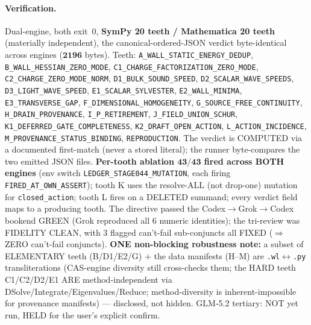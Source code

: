 \paragraph{Verification.}
Dual-engine, both exit~0, \textbf{SymPy 20 teeth / Mathematica 20 teeth} (materially
independent), the canonical-ordered-JSON verdict byte-identical across engines
(\(\mathbf{2196}\) bytes). Teeth: \texttt{A\_WALL\_STATIC\_ENERGY\_DEDUP},
\texttt{B\_WALL\_HESSIAN\_ZERO\_MODE}, \texttt{C1\_CHARGE\_FACTORIZATION\_ZERO\_MODE},
\texttt{C2\_CHARGE\_ZERO\_MODE\_NORM}, \texttt{D1\_BULK\_SOUND\_SPEED},
\texttt{D2\_SCALAR\_WAVE\_SPEEDS}, \texttt{D3\_LIGHT\_WAVE\_SPEED},
\texttt{E1\_SCALAR\_SYLVESTER}, \texttt{E2\_WALL\_MINIMA}, \texttt{E3\_TRANSVERSE\_GAP},
\texttt{F\_DIMENSIONAL\_HOMOGENEITY}, \texttt{G\_SOURCE\_FREE\_CONTINUITY},
\texttt{H\_DRAIN\_PROVENANCE}, \texttt{I\_P\_RETIREMENT}, \texttt{J\_FIELD\_UNION\_SCHUR},
\texttt{K1\_DEFERRED\_GATE\_COMPLETENESS}, \texttt{K2\_DRAFT\_OPEN\_ACTION},
\texttt{L\_ACTION\_INCIDENCE}, \texttt{M\_PROVENANCE\_STATUS\_BINDING},
\texttt{REPRODUCTION}. The verdict is COMPUTED via a documented first-match (never a
stored literal); the runner byte-compares the two emitted JSON files.
\textbf{Per-tooth ablation \(\mathbf{43/43}\) fired across BOTH engines} (env switch
\texttt{LEDGER\_STAGE044\_MUTATION}, each firing \texttt{FIRED\_AT\_OWN\_ASSERT}); tooth
K uses the resolve-ALL (not drop-one) mutation for \texttt{closed\_action}; tooth L
fires on a DELETED summand; every verdict field maps to a producing tooth. The
directive passed the Codex\(\to\)Grok\(\to\)Codex bookend GREEN (Grok reproduced all 6
numeric identities); the tri-review was FIDELITY CLEAN, with 3 flagged can't-fail
sub-conjuncts all FIXED (\(\Rightarrow\) ZERO can't-fail conjuncts). \textbf{ONE
non-blocking robustness note:} a subset of ELEMENTARY teeth (B/D1/E2/G) \(+\) the data
manifests (H--M) are \texttt{.wl}\(\leftrightarrow\)\texttt{.py} transliterations
(CAS-engine diversity still cross-checks them; the HARD teeth C1/C2/D2/E1 ARE
method-independent via DSolve/Integrate/Eigenvalues/Reduce; method-diversity is
inherent-impossible for provenance manifests) --- disclosed, not hidden. GLM-5.2
tertiary: NOT yet run, HELD for the user's explicit confirm.

